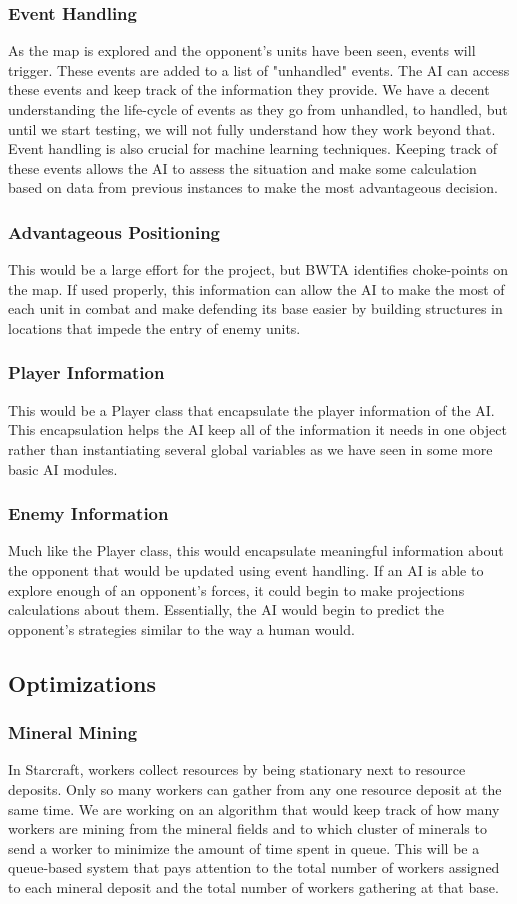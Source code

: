 \documentclass[10pt,letterpaper,onecolumn,draftclsnofoot]{IEEEtran}
\begin{document}
	\subsubsection{Event Handling}
	As the map is explored and the opponent's units have been seen, events will trigger. These events are added to a list of "unhandled" events. The AI can access these events and keep track of the information they provide. We have a decent understanding the life-cycle of events as they go from unhandled, to handled, but until we start testing, we will not fully understand how they work beyond that.
	Event handling is also crucial for machine learning techniques. Keeping track of these events allows the AI to assess the situation and make some calculation based on data from previous instances to make the most advantageous decision.  
	\subsubsection{Advantageous Positioning}
	This would be a large effort for the project, but BWTA identifies choke-points on the map. If used properly, this information can allow the AI to make the most of each unit in combat and make defending its base easier by building structures in locations that impede the entry of enemy units.
	\subsubsection{Player Information}
	This would be a Player class that encapsulate the player information of the AI. This encapsulation helps the AI keep all of the information it needs in one object rather than instantiating several global variables as we have seen in some more basic AI modules. 
	\subsubsection{Enemy Information}
	Much like the Player class, this would encapsulate meaningful information about the opponent that would be updated using event handling. If an AI is able to explore enough of an opponent's forces, it could begin to make projections calculations about them. Essentially, the AI would begin to predict the opponent's strategies similar to the way a human would. 
	
	\subsection{Optimizations}
	\subsubsection{Mineral Mining}
	In Starcraft, workers collect resources by being stationary next to resource deposits. Only so many workers can gather from any one resource deposit at the same time. We are working on an algorithm that would keep track of how many workers are mining from the mineral fields and to which cluster of minerals to send a worker to minimize the amount of time spent in queue. This will be a queue-based system that pays attention to the total number of workers assigned to each mineral deposit and the total number of workers gathering at that base. 
\end{document}

